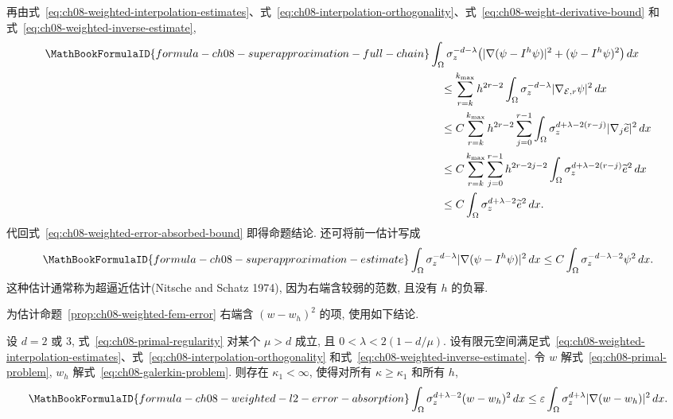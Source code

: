 \begin{Proof}
\begin{equation}
\end{equation}
再由式~\eqref{eq:ch08-weighted-interpolation-estimates}、式~\eqref{eq:ch08-interpolation-orthogonality}、式~\eqref{eq:ch08-weight-derivative-bound} 和式~\eqref{eq:ch08-weighted-inverse-estimate},
\begin{align*}
\MathBookFormulaID{formula-ch08-superapproximation-full-chain}
&\int_\Omega\sigma_z^{-d-\lambda}
\bigl(|\nabla(\psi-I^h\psi)|^2+(\psi-I^h\psi)^2\bigr)\,dx\\
&\quad\leq\sum_{r=k}^{k_{\max}}h^{2r-2}
\int_\Omega\sigma_z^{-d-\lambda}|\nabla_{\mathcal E,r}\psi|^2\,dx\\
&\quad\leq C\sum_{r=k}^{k_{\max}}h^{2r-2}
\sum_{j=0}^{r-1}\int_\Omega\sigma_z^{d+\lambda-2(r-j)}|\nabla_j\widetilde e|^2\,dx\\
&\quad\leq C\sum_{r=k}^{k_{\max}}\sum_{j=0}^{r-1}h^{2r-2j-2}
\int_\Omega\sigma_z^{d+\lambda-2(r-j)}\widetilde e^2\,dx\\
&\quad\leq C\int_\Omega\sigma_z^{d+\lambda-2}\widetilde e^2\,dx.
\end{align*}
代回式~\eqref{eq:ch08-weighted-error-absorbed-bound} 即得命题结论. 还可将前一估计写成
\begin{equation}
\MathBookFormulaID{formula-ch08-superapproximation-estimate}
\label{eq:ch08-superapproximation-estimate}
\int_\Omega\sigma_z^{-d-\lambda}|\nabla(\psi-I^h\psi)|^2\,dx
\leq C\int_\Omega\sigma_z^{-d-\lambda-2}\psi^2\,dx.
\end{equation}
这种估计通常称为超逼近估计(Nitsche and Schatz 1974), 因为右端含较弱的范数, 且没有 $h$ 的负幂.
\end{Proof}

为估计命题~\ref{prop:ch08-weighted-fem-error} 右端含 $(w-w_h)^2$ 的项, 使用如下结论.

\begin{Proposition}
\label{prop:ch08-weighted-l2-error-absorption}
设 $d=2$ 或 $3$, 式~\eqref{eq:ch08-primal-regularity} 对某个 $\mu>d$ 成立, 且 $0<\lambda<2(1-d/\mu)$. 设有限元空间满足式~\eqref{eq:ch08-weighted-interpolation-estimates}、式~\eqref{eq:ch08-interpolation-orthogonality} 和式~\eqref{eq:ch08-weighted-inverse-estimate}. 令 $w$ 解式~\eqref{eq:ch08-primal-problem}, $w_h$ 解式~\eqref{eq:ch08-galerkin-problem}. 则存在 $\kappa_1<\infty$, 使得对所有 $\kappa\geq\kappa_1$ 和所有 $h$,
\[
\MathBookFormulaID{formula-ch08-weighted-l2-error-absorption}
\int_\Omega\sigma_z^{d+\lambda-2}(w-w_h)^2\,dx
\leq\varepsilon\int_\Omega\sigma_z^{d+\lambda}|\nabla(w-w_h)|^2\,dx.
\]
\end{Proposition}

